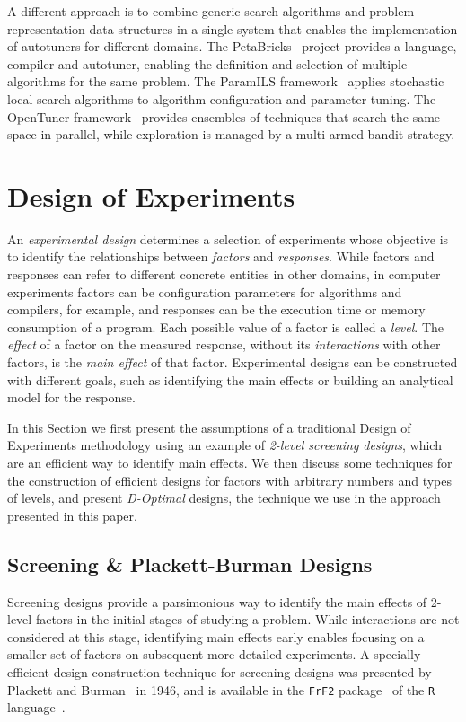 \documentclass[conference]{IEEEtran}
\begin{document}
A different approach is to combine generic search algorithms and problem
representation data structures in a single system that enables the
implementation of autotuners for different domains. The
PetaBricks~\cite{ansel2009petabricks} project provides a language,
compiler and autotuner, enabling the definition and selection of multiple
algorithms for the same problem. The ParamILS
framework~\cite{hutter2009paramils} applies stochastic local search
algorithms to algorithm configuration and parameter tuning. The OpenTuner
framework~\cite{ansel2014opentuner} provides ensembles of techniques that
search the same space in parallel, while exploration is managed by a multi-armed
bandit strategy.
\section{Design of Experiments}
\label{sec:org587eea5}
An \emph{experimental design} determines a selection of experiments whose objective
is to identify the relationships between \emph{factors} and \emph{responses}. While
factors and responses can refer to different concrete entities in other domains,
in computer experiments factors can be configuration parameters for algorithms
and compilers, for example, and responses can be the execution time or memory
consumption of a program. Each possible value of a factor is called a \emph{level}.
The \emph{effect} of a factor on the measured response, without its \emph{interactions}
with other factors, is the \emph{main effect} of that factor. Experimental designs
can be constructed with different goals, such as identifying the main effects
or building an analytical model for the response.

In this Section we first present the assumptions of a traditional Design of
Experiments methodology using an example of \emph{2-level screening designs}, which
are an efficient way to identify main effects. We then discuss some techniques
for the construction of efficient designs for factors with arbitrary numbers and
types of levels, and present \emph{D-Optimal} designs, the technique we use in the
approach presented in this paper.
\subsection{Screening \& Plackett-Burman Designs}
\label{sec:org2c64eb2}
Screening designs provide a parsimonious way to identify the main
effects of 2-level factors in the initial stages of studying a problem. While
interactions are not considered at this stage, identifying main effects early
enables focusing on a smaller set of factors on subsequent more detailed
experiments. A specially efficient design construction technique for screening
designs was presented by Plackett and Burman~\cite{plackett1946design} in
1946, and is available in the \texttt{FrF2}
package~\cite{gromping2014frf2} of the \texttt{R}
language~\cite{team2018rlanguage}.
\end{document}
